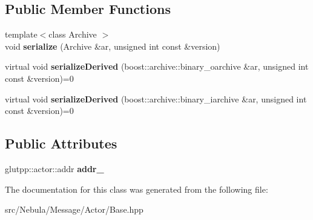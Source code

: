 \subsection*{\-Public \-Member \-Functions}
\begin{DoxyCompactItemize}
\item 
\hypertarget{classNeb_1_1Message_1_1Actor_1_1Base_a961a74203562be229bb3bd1a047dc6d2}{{\footnotesize template$<$class Archive $>$ }\\void {\bfseries serialize} (\-Archive \&ar, unsigned int const \&version)}\label{classNeb_1_1Message_1_1Actor_1_1Base_a961a74203562be229bb3bd1a047dc6d2}

\item 
\hypertarget{classNeb_1_1Message_1_1Actor_1_1Base_a81b750ebdc5e296d9ea892fe8e069934}{virtual void {\bfseries serialize\-Derived} (boost\-::archive\-::binary\-\_\-oarchive \&ar, unsigned int const \&version)=0}\label{classNeb_1_1Message_1_1Actor_1_1Base_a81b750ebdc5e296d9ea892fe8e069934}

\item 
\hypertarget{classNeb_1_1Message_1_1Actor_1_1Base_a32fc3888e2723e8babdb9d131bac7692}{virtual void {\bfseries serialize\-Derived} (boost\-::archive\-::binary\-\_\-iarchive \&ar, unsigned int const \&version)=0}\label{classNeb_1_1Message_1_1Actor_1_1Base_a32fc3888e2723e8babdb9d131bac7692}

\end{DoxyCompactItemize}
\subsection*{\-Public \-Attributes}
\begin{DoxyCompactItemize}
\item 
\hypertarget{classNeb_1_1Message_1_1Actor_1_1Base_af9251bc98dac471dfa943dd441b0aa3b}{glutpp\-::actor\-::addr {\bfseries addr\-\_\-}}\label{classNeb_1_1Message_1_1Actor_1_1Base_af9251bc98dac471dfa943dd441b0aa3b}

\end{DoxyCompactItemize}


\-The documentation for this class was generated from the following file\-:\begin{DoxyCompactItemize}
\item 
src/\-Nebula/\-Message/\-Actor/\-Base.\-hpp\end{DoxyCompactItemize}
